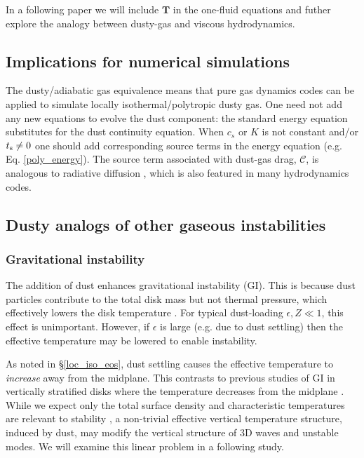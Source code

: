 In a following paper we will include $\bm{T}$ in the one-fluid
equations and futher explore the analogy between dusty-gas and viscous
hydrodynamics. 





\subsection{Implications for numerical simulations}
The dusty/adiabatic gas equivalence means that pure
gas dynamics codes can be applied to simulate locally
isothermal/polytropic dusty gas. One need not add any new 
equations to evolve the dust component: 
 the standard energy equation substitutes for the dust continuity
equation. When $c_s$ or $K$ is not constant and/or $t_\mathrm{s}\neq0$ one
should add corresponding source terms in the energy equation
(e.g. Eq. \ref{poly_energy}). 
The source term associated with dust-gas drag, $\mathcal{C}$, is 
analogous to radiative diffusion \citep{price15}, which is also
featured in many hydrodynamics codes.      

\subsection{Dusty analogs of other gaseous instabilities}  


\subsubsection{Gravitational instability} %
The addition of dust enhances gravitational
instability (GI). This is because dust particles contribute to the
total disk mass but not thermal pressure, which effectively lowers the
disk temperature \citep[][]{thompson88,shi13}. For typical dust-loading 
$\epsilon, Z\ll1$, this effect is unimportant. However, if $\epsilon$ is
large (e.g. due to dust settling) then the effective temperature may 
be lowered to enable instability. 

As noted in \S\ref{loc_iso_eos}, dust settling causes the effective
temperature to \emph{increase} away from the midplane. This contrasts
to previous studies of GI in vertically stratified disks
 where the temperature decreases
from the midplane \citep[e.g.][]{mamat10, kim12,lin14c}. 
While we expect only the total surface density and
characteristic temperatures are relevant to stability  
\citep{toomre64}, a non-trivial effective vertical temperature
structure, induced by dust, may modify the vertical structure of 3D
waves and unstable modes. We will examine this linear problem in a following 
study.  

